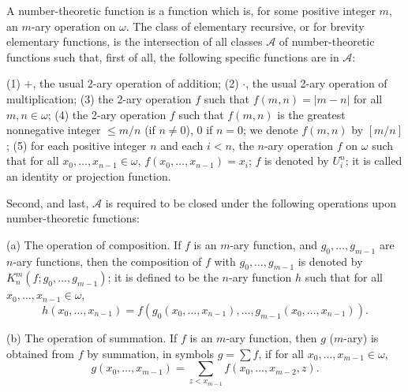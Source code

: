 A number-theoretic function is a function which is, for some positive integer $m$, an $m$-ary operation on $\omega$. The class of elementary recursive, or for brevity elementary functions, is the intersection of all classes $\mathcal{A}$ of number-theoretic functions such that, first of all, the following specific functions are in $\mathcal{A}$:

(1) $+$, the usual 2-ary operation of addition;
(2) $\cdot$, the usual 2-ary operation of multiplication;
(3) the 2-ary operation $f$ such that $f(m, n) = |m - n|$ for all $m, n \in \omega$;
(4) the 2-ary operation $f$ such that $f(m, n)$ is the greatest nonnegative integer $\leq m/n$ (if $n \neq 0$), $0$ if $n = 0$; we denote $f(m, n)$ by $[m/n]$;
(5) for each positive integer $n$ and each $i < n$, the $n$-ary operation $f$ on $\omega$ such that for all $x_0, \ldots, x_{n-1} \in \omega$, $f(x_0, \ldots, x_{n-1}) = x_i$; $f$ is denoted by $U_i^n$; it is called an identity or projection function.

Second, and last, $\mathcal{A}$ is required to be closed under the following operations upon number-theoretic functions:

(a) The operation of composition. If $f$ is an $m$-ary function, and $g_0, \ldots, g_{m-1}$ are $n$-ary functions, then the composition of $f$ with $g_0, \ldots, g_{m-1}$ is denoted by $K_n^m(f; g_0, \ldots, g_{m-1})$; it is defined to be the $n$-ary function $h$ such that for all $x_0, \ldots, x_{n-1} \in \omega$,
\[
h(x_0, \ldots, x_{n-1}) = f(g_0(x_0, \ldots, x_{n-1}), \ldots, g_{m-1}(x_0, \ldots, x_{n-1})).
\]

(b) The operation of summation. If $f$ is an $m$-ary function, then $g$ ($m$-ary) is obtained from $f$ by summation, in symbols $g = \sum f$, if for all $x_0, \ldots, x_{m-1} \in \omega$,
\[
g(x_0, \ldots, x_{m-1}) = \sum_{z < x_{m-1}} f(x_0, \ldots, x_{m-2}, z).
\]
